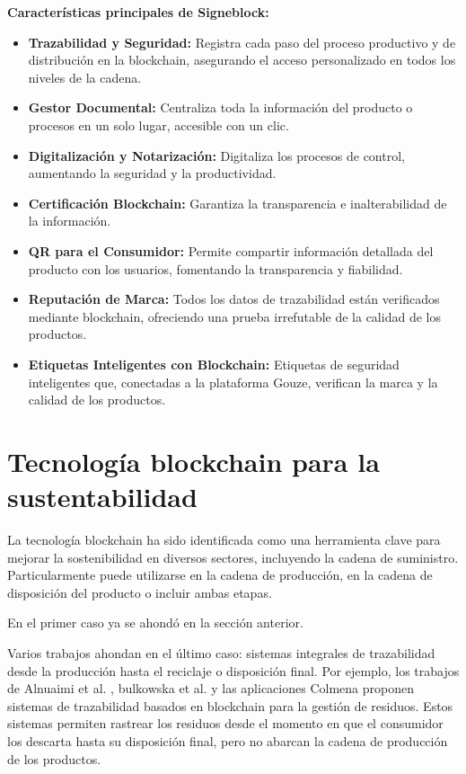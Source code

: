 \documentclass[main.tex]{subfiles}
\begin{document}
\textbf{Características principales de Signeblock:}
\begin{itemize}
  \item \textbf{Trazabilidad y Seguridad:} Registra cada paso del proceso productivo y de distribución en la blockchain, asegurando el acceso personalizado en todos los niveles de la cadena.
  \item \textbf{Gestor Documental:} Centraliza toda la información del producto o procesos en un solo lugar, accesible con un clic.
  \item \textbf{Digitalización y Notarización:} Digitaliza los procesos de control, aumentando la seguridad y la productividad.
  \item \textbf{Certificación Blockchain:} Garantiza la transparencia e inalterabilidad de la información.
  \item \textbf{QR para el Consumidor:} Permite compartir información detallada del producto con los usuarios, fomentando la transparencia y fiabilidad.
  \item \textbf{Reputación de Marca:} Todos los datos de trazabilidad están verificados mediante blockchain, ofreciendo una prueba irrefutable de la calidad de los productos.
  \item \textbf{Etiquetas Inteligentes con Blockchain:} Etiquetas de seguridad inteligentes que, conectadas a la plataforma Gouze, verifican la marca y la calidad de los productos.
\end{itemize}

\section{Tecnología blockchain para la sustentabilidad}

La tecnología blockchain ha sido identificada como una herramienta clave para mejorar la sostenibilidad en diversos sectores, incluyendo la cadena de suministro. Particularmente puede utilizarse en la cadena de producción, en la cadena de disposición del producto o incluir ambas etapas.

En el primer caso ya se ahondó en la sección anterior.

Varios trabajos ahondan en el último caso: sistemas integrales de trazabilidad desde la producción hasta el reciclaje o disposición final. Por ejemplo, los trabajos de Alnuaimi et al. \cite{alnuaimi2023blockchain}, bulkowska et al. \cite{bulkowska2023implementation} y las aplicaciones Colmena \cite{colmena2024} proponen sistemas de trazabilidad basados en blockchain para la gestión de residuos. Estos sistemas permiten rastrear los residuos desde el momento en que el consumidor los descarta hasta su disposición final, pero no abarcan la cadena de producción de los productos.
\end{document}
